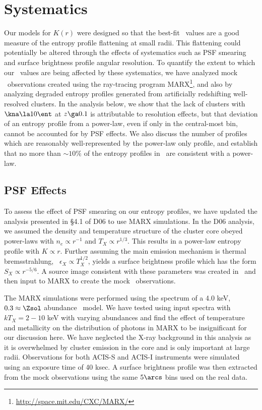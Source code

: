 \documentclass{emulateapj}
\begin{document}
\section{Systematics}
\label{sec:sys}

Our models for $K(r)$ were designed so that the best-fit \kna\ values
are a good measure of the entropy profile flattening at small
radii. This flattening could potentially be altered through the
effects of systematics such as PSF smearing and surface brightness
profile angular resolution. To quantify the extent to which our
\kna\ values are being affected by these systematics, we have analyzed
mock \chandra\ observations created using the ray-tracing program
MARX\footnote{\url{http://space.mit.edu/CXC/MARX/}}, and also by
analyzing degraded entropy profiles generated from artificially
redshifting well-resolved clusters. In the analysis below, we show
that the lack of clusters with $\kna \la 10 \ent$ at $z \ga 0.1$ is
attributable to resolution effects, but that deviation of an entropy
profile from a power-law, even if only in the central-most bin, cannot
be accounted for by PSF effects. We also discuss the number of
profiles which are reasonably well-represented by the power-law only
profile, and establish that no more than $\sim 10\%$ of the entropy
profiles in \accept\ are consistent with a power-law.

\subsection{PSF Effects}
\label{sec:psf}

To assess the effect of PSF smearing on our entropy profiles, we have
updated the analysis presented in \S4.1 of D06 to use MARX
simulations. In the D06 analysis, we assumed the density and
temperature structure of the cluster core obeyed power-laws with $n_e
\propto r^{-1}$ and $T_X \propto r^{1/3}$. This results in a power-law
entropy profile with $K \propto r$. Further assuming the main emission
mechanism is thermal bremsstrahlung, \ie\ $\epsilon_X \propto
T_X^{1/2}$, yields a surface brightness profile which has the form
$S_X \propto r^{-5/6}$. A source image consistent with these
parameters was created in \idl\ and then input to MARX to create the
mock \chandra\ observations.

The MARX simulations were performed using the spectrum of a 4.0 keV,
$0.3 \approx \Zsol$ abundance \mekal\ model. We have tested using
input spectra with $kT_X = 2-10$ keV with varying abundances and find
the effect of temperature and metallicity on the distribution of
photons in MARX to be insignificant for our discussion here. We have
neglected the X-ray background in this analysis as it is overwhelmed
by cluster emission in the core and is only important at large
radii. Observations for both ACIS-S and ACIS-I instruments were
simulated using an exposure time of 40 ksec. A surface brightness
profile was then extracted from the mock observations using the same
$5\arcs$ bins used on the real data.
\end{document}
